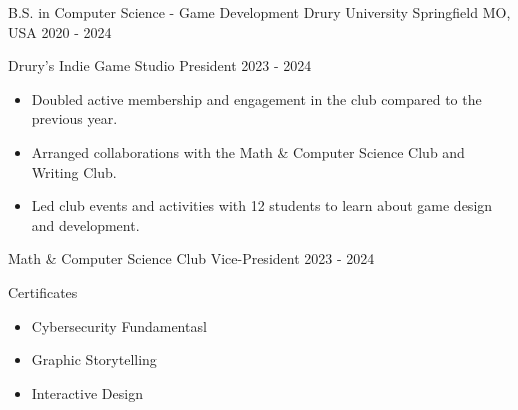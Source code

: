 

\begin{cventries}

  \cventry
    {B.S. in Computer Science - Game Development} %
    {Drury University} %
    {Springfield MO, USA} %
    {2020 - 2024} %
    {
      \begin{cvitems} %
        \item {Drury's Indie Game Studio President 2023 - 2024}
            \newline
            \begin{itemize}
                \item {Doubled active membership and engagement in the club compared to the previous year.}
                \item {Arranged collaborations with the Math \& Computer Science Club and Writing Club.}
                \item {Led club events and activities with 12 students to learn about game design and development.}
            \end{itemize}
        \item {Math \& Computer Science Club Vice-President 2023 - 2024}
	\item {Certificates}
		\newline
		\begin{itemize}
			\item {Cybersecurity Fundamentasl}
			\item {Graphic Storytelling}
			\item {Interactive Design}
		\end{itemize}
      \end{cvitems}
    }

\end{cventries}
